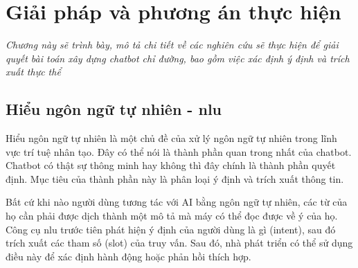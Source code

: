 \chapter{Giải pháp và phương án thực hiện}
\label{Chapter3}

\emph{Chương này sẽ trình bày, mô tả chi tiết về các nghiên cứu sẽ thực hiện để giải quyết bài toán xây dựng chatbot chỉ đường, bao gồm việc xác định ý định và trích xuất thực thể}

\section{Hiểu ngôn ngữ tự nhiên - \ac{nlu}}

Hiểu ngôn ngữ tự nhiên là một chủ đề của xử lý ngôn ngữ tự nhiên trong lĩnh vực trí tuệ nhân tạo. Đây có thể nói là thành phần quan trong nhất của chatbot. Chatbot có thật sự thông minh hay không thì đây chính là thành phần quyết định. Mục tiêu của thành phần này là phân loại ý định và trích xuất thông tin.

Bất cứ khi nào người dùng tương tác với AI bằng ngôn ngữ tự nhiên, các từ của họ cần phải được dịch thành một mô tả mà máy có thể đọc được về ý của họ.
Công cụ \ac{nlu} trước tiên phát hiện ý định của người dùng là gì (intent), sau đó trích xuất các tham số (slot) của truy vấn. Sau đó, nhà phát triển có thể sử dụng điều này để xác định hành động hoặc phản hồi thích hợp.

